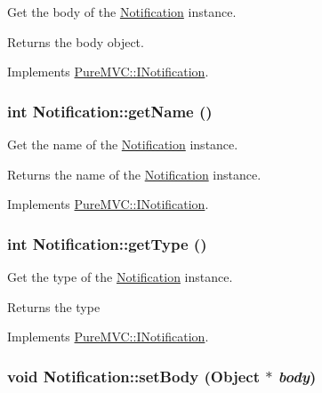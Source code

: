 Get the body of the {\ttfamily \hyperlink{class_pure_m_v_c_1_1_notification}{Notification}} instance. \begin{DoxyReturn}{Returns}
the body object. 
\end{DoxyReturn}


Implements \hyperlink{class_pure_m_v_c_1_1_i_notification_a175f91568692855cdeb2642156d34e05}{PureMVC::INotification}.\hypertarget{class_pure_m_v_c_1_1_notification_aed76b38c526e916005fb55fc3d9f714f}{
\subsubsection[{getName}]{\setlength{\rightskip}{0pt plus 5cm}int Notification::getName ()}}
\label{class_pure_m_v_c_1_1_notification_aed76b38c526e916005fb55fc3d9f714f}


Get the name of the {\ttfamily \hyperlink{class_pure_m_v_c_1_1_notification}{Notification}} instance. \begin{DoxyReturn}{Returns}
the name of the {\ttfamily \hyperlink{class_pure_m_v_c_1_1_notification}{Notification}} instance. 
\end{DoxyReturn}


Implements \hyperlink{class_pure_m_v_c_1_1_i_notification_a47236c554cb055f0d422270abc65778b}{PureMVC::INotification}.\hypertarget{class_pure_m_v_c_1_1_notification_a05e70c01afdee0dbaff570789ee761b1}{
\subsubsection[{getType}]{\setlength{\rightskip}{0pt plus 5cm}int Notification::getType ()}}
\label{class_pure_m_v_c_1_1_notification_a05e70c01afdee0dbaff570789ee761b1}


Get the type of the {\ttfamily \hyperlink{class_pure_m_v_c_1_1_notification}{Notification}} instance. \begin{DoxyReturn}{Returns}
the type 
\end{DoxyReturn}


Implements \hyperlink{class_pure_m_v_c_1_1_i_notification_a40c8210a691d342cedcb558beef3ef52}{PureMVC::INotification}.\hypertarget{class_pure_m_v_c_1_1_notification_a9cae1ba418db7451e7afd6ddd40b2cbf}{
\subsubsection[{setBody}]{\setlength{\rightskip}{0pt plus 5cm}void Notification::setBody ({\bf Object} $\ast$ {\em body})}}
\label{class_pure_m_v_c_1_1_notification_a9cae1ba418db7451e7afd6ddd40b2cbf}


